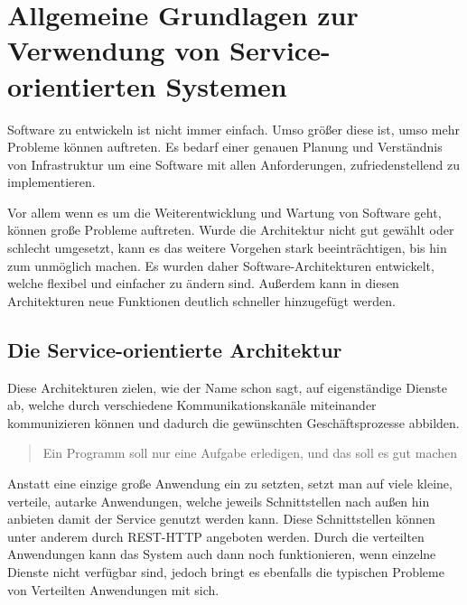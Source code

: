 \chapter[Grundlagen]{Allgemeine Grundlagen zur Verwendung von Service-orientierten Systemen}
\label{chap:grundlagen}
Software zu entwickeln ist nicht immer einfach. Umso größer diese ist, umso mehr Probleme können auftreten. Es bedarf einer genauen Planung und Verständnis von Infrastruktur um eine Software mit allen Anforderungen, zufriedenstellend zu implementieren. 

Vor allem wenn es um die Weiterentwicklung und Wartung von Software geht, können große Probleme auftreten. Wurde die Architektur nicht gut gewählt oder schlecht umgesetzt, kann es das weitere Vorgehen stark beeinträchtigen, bis hin zum unmöglich machen. Es wurden daher Software-Architekturen entwickelt, welche flexibel und einfacher zu ändern sind. Außerdem kann in diesen Architekturen neue Funktionen deutlich schneller hinzugefügt werden.

\section{Die Service-orientierte Architektur}
\label{sec:architektur}
Diese Architekturen zielen, wie der Name schon sagt, auf eigenständige Dienste ab, welche durch verschiedene Kommunikationskanäle miteinander kommunizieren können und dadurch die gewünschten Geschäftsprozesse abbilden. 
\begin{quotation}
    \frqq Ein Programm soll nur eine Aufgabe erledigen, und das soll es gut machen\flqq \cite[S. 2]{EWolff2015:ContinuouosDelivery}
\end{quotation}
Anstatt eine einzige große Anwendung ein zu setzten, setzt man auf viele kleine, verteile, autarke Anwendungen, welche jeweils Schnittstellen nach außen hin anbieten damit der Service genutzt werden kann. Diese Schnittstellen können unter anderem durch REST-HTTP angeboten werden.
Durch die verteilten Anwendungen kann das System auch dann noch funktionieren, wenn einzelne Dienste nicht verfügbar sind, jedoch bringt es ebenfalls die typischen Probleme von Verteilten Anwendungen mit sich.

